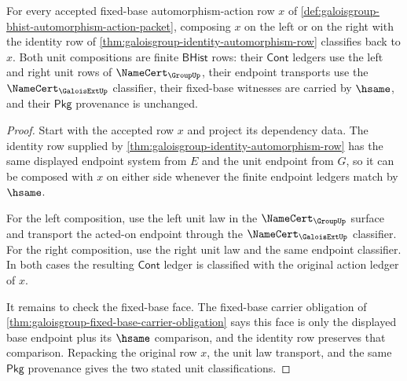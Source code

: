 \begin{theorem}
\label{thm:galoisgroup-unit-action-laws}
For every accepted fixed-base automorphism-action row $x$ of
\autoref{def:galoisgroup-bhist-automorphism-action-packet}, composing $x$ on
the left or on the right with the identity row of
\autoref{thm:galoisgroup-identity-automorphism-row} classifies back to $x$.
Both unit compositions are finite $\mathsf{BHist}$ rows: their
$\mathsf{Cont}$ ledgers use the left and right unit rows of
$\NameCert_{\GroupUp}$, their endpoint transports use the
$\NameCert_{\GaloisExtUp}$ classifier, their fixed-base witnesses are carried
by $\hsame$, and their $\mathsf{Pkg}$ provenance is unchanged.
\end{theorem}
\begin{proof}
Start with the accepted row $x$ and project its dependency data. The identity
row supplied by \autoref{thm:galoisgroup-identity-automorphism-row} has the
same displayed endpoint system from $E$ and the unit endpoint from $G$, so it
can be composed with $x$ on either side whenever the finite endpoint ledgers
match by $\hsame$.

For the left composition, use the left unit law in the
$\NameCert_{\GroupUp}$ surface and transport the acted-on endpoint through the
$\NameCert_{\GaloisExtUp}$ classifier. For the right composition, use the right
unit law and the same endpoint classifier. In both cases the resulting
$\mathsf{Cont}$ ledger is classified with the original action ledger of $x$.

It remains to check the fixed-base face. The fixed-base carrier obligation of
\autoref{thm:galoisgroup-fixed-base-carrier-obligation} says this face is only
the displayed base endpoint plus its $\hsame$ comparison, and the identity row
preserves that comparison. Repacking the original row $x$, the unit law
transport, and the same $\mathsf{Pkg}$ provenance gives the two stated unit
classifications.
\end{proof}
